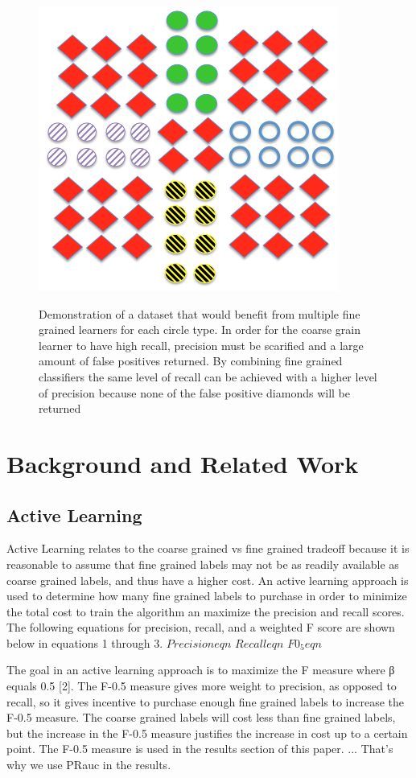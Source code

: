 \documentclass[ms]{nuthesis}
\begin{document}
\FloatBarrier
\begin{figure}[!htb]
	\centering
    \includegraphics[width=0.5\columnwidth]{fig/union}
    \label{fig:union}
    \caption{Demonstration of a dataset that would benefit from multiple fine grained
    learners for each circle type. In order for the coarse grain learner to have high
    recall, precision must be scarified and a large amount of false positives returned.
    By combining fine grained classifiers the same level of recall can be achieved with a
    higher level of precision because none of the false positive diamonds will be returned}
\end{figure}
\FloatBarrier


\chapter{Background and Related Work}
\section{Active Learning}
\par Active Learning relates to the coarse grained vs fine grained tradeoff because it is
reasonable to assume that fine grained labels may not be as readily available as coarse grained
labels, and thus have a higher cost. An active learning approach is used to determine how
many fine grained labels to purchase in order to minimize the total cost to train the
algorithm an maximize the precision and recall scores. The following equations for
precision, recall, and a weighted F score are shown below in equations 1 through 3.
\break
$Precision eqn$ \break
$Recall eqn$ \break
$F0_5 eqn$ \break
\break
\par The goal in an active learning approach is to maximize the F measure where β equals 0.5 [2].
The F-0.5 measure gives more weight to precision, as opposed to recall, so it gives
incentive to purchase enough fine grained labels to increase the F-0.5 measure. The
coarse grained labels will cost less than fine grained labels, but the increase in
the F-0.5 measure justifies the increase in cost up to a certain point. The F-0.5
measure is used in the results section of this paper. ... That's why we use PRauc in the results.
\end{document}

